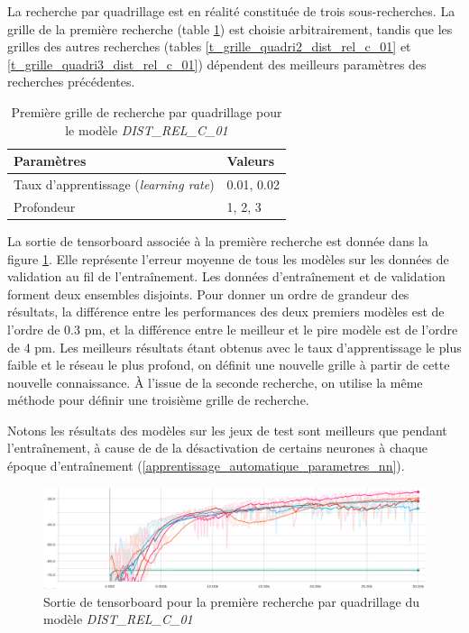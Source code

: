 \par La recherche par quadrillage est en réalité constituée de trois sous-recherches. La grille de la première recherche (table \ref{t_grille1_quadri_dist_rel_c_01}) est choisie arbitrairement, tandis que les grilles des autres recherches (tables \ref{t_grille_quadri2_dist_rel_c_01} et \ref{t_grille_quadri3_dist_rel_c_01}) dépendent des meilleurs paramètres des recherches précédentes.

\begin{table}
	\centering
	
	\begin{tabular}{|l|l|}
		\hline
		\textbf{Paramètres} & \textbf{Valeurs} \\ \hline 
		Taux d'apprentissage (\emph{learning rate}) & 0.01, 0.02 \\ \hline
		Profondeur & 1, 2, 3 \\ \hline
	\end{tabular}		
	
	\caption{Première grille de recherche par quadrillage pour le modèle \emph{DIST\_REL\_C\_01}}
	\label{t_grille1_quadri_dist_rel_c_01}
\end{table}

\par La sortie de tensorboard associée à la première recherche est donnée dans la figure \ref{fig_sortie_tfb}. Elle représente l'erreur moyenne de tous les modèles sur les données de validation au fil de l'entraînement. Les données d'entraînement et de validation forment deux ensembles disjoints. Pour donner un ordre de grandeur des résultats, la différence entre les performances des deux premiers modèles est de l'ordre de 0.3 pm, et la différence entre le meilleur et le pire modèle est de l'ordre de 4 pm. Les meilleurs résultats étant obtenus avec le taux d'apprentissage le plus faible et le réseau le plus profond, on définit une nouvelle grille à partir de cette nouvelle connaissance. À l'issue de la seconde recherche, on utilise la même méthode pour définir une troisième grille de recherche.
\par Notons les résultats des modèles sur les jeux de test sont meilleurs que pendant l'entraînement, à cause de de la désactivation de certains neurones à chaque époque d'entraînement (\ref{apprentissage_automatique_parametres_nn}).


\begin{figure}
	\centering
	\includegraphics[scale=0.35]{images/tboard.png}
	\caption{Sortie de tensorboard pour la première recherche par quadrillage du modèle \emph{DIST\_REL\_C\_01}}
	\label{fig_sortie_tfb}
\end{figure}


